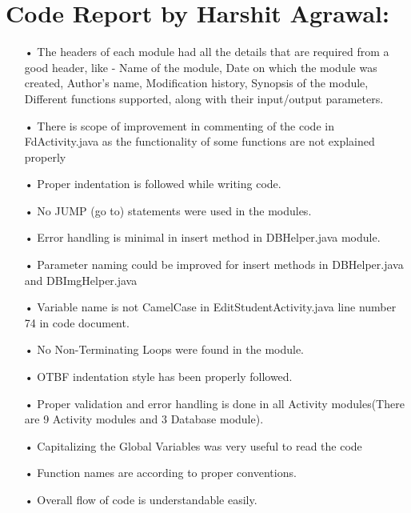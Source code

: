 \documentclass{scrreprt}
\begin{document}
\section{Code Report by Harshit Agrawal:}
\begin{itemize}
\item[•] The headers of each module had all the details that are required from a good
header, like - Name of the module, Date on which the module was created, Author’s
name, Modification history, Synopsis of the module, Different functions supported,
along with their input/output parameters.

\item[•] There is scope of improvement in commenting of the code in FdActivity.java as the functionality of
some functions are not explained properly

\item[•] Proper indentation is followed while writing code.
\item[•] No JUMP (go to) statements were used in the modules.
\item[•] Error handling is minimal in insert method in DBHelper.java module.
\item[•] Parameter naming could be improved for insert methods in DBHelper.java and DBImgHelper.java
\item[•] Variable name is not CamelCase in EditStudentActivity.java line number 74 in code document.
\item[•] No Non-Terminating Loops were found in the module.
\item[•] OTBF indentation style has been properly followed. 
\item[•] Proper validation and error handling is done in all Activity modules(There are 9 Activity modules and 3 Database module).
\item[•] Capitalizing the Global Variables was very useful to read the code
\item[•] Function names are according to proper conventions.
\item[•] Overall flow of code is understandable easily.
\end{itemize}
\newpage
\end{document}

